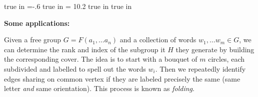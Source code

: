 
\overfullrule=0pt
\parindent=0pt

\nopagenumbers




 true in
\hoffset=-.6 true in
\hsize = 10.2 true in
 true in



\def\cltr{\Red}		  %

\loadmsbm



\def\ctln{\centerline}
\def\u{\underbar}
\def\ssk{\smallskip}
\def\msk{\medskip}
\def\bsk{\bigskip}
\def\hsk{\hskip.1in}
\def\hhsk{\hskip.2in}
\def\dsl{\displaystyle}
\def\hskp{\hskip1.5in}

\def\lra{$\Leftrightarrow$ }
\def\ra{\rightarrow}
\def\mpto{\logmapsto}
\def\pu{\pi_1}
\def\mpu{$\pi_1$}
\def\sig{\Sigma}
\def\msig{$\Sigma$}
\def\ep{\epsilon}
\def\sset{\subseteq}
\def\del{\partial}
\def\inv{^{-1}}
\def\wtl{\widetilde}
\def\del{\partial}
\def\delp{\partial^\prime}
\def\delpp{\partial^{\prime\prime}}
\def\sgn{{\roman{sgn}}}
\def\wtih{\widetilde{H}}
\def\bbz{{\Bbb Z}}
\def\bbr{{\Bbb R}}
\def\rtar{$\Rightarrow$}

\def\cltr{\Red}		  %
\def\cltb{\Blue}		  %
\def\cltg{\PineGreen}	  %




{\bf Some applications:}

\ssk

Given a free group
$G=F(a_1,\ldots a_n)$ and a collection of words $w_1,\ldots w_m\in G$,
we can determine the rank and index of the subgroup it $H$ they
generate by building the corresponding cover. The idea is
to start with a bouquet of $m$ circles, each subdivided 
and labelled to spell
out the words $w_i$. Then we repeatedly identify edges sharing
on common vertex if they are labeled precisely the same (same
letter {\it and} same orientation). This process is known
as {\it folding}. 

\ssk

